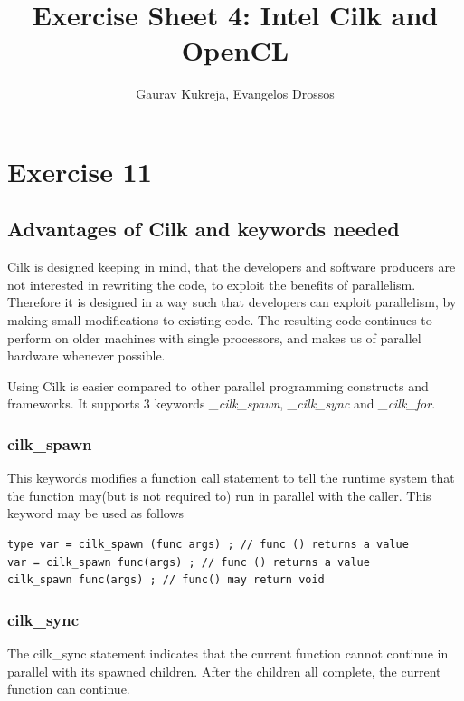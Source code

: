 \documentclass[]{scrartcl}
\title{Exercise Sheet 4: Intel Cilk and OpenCL}
\author{Gaurav Kukreja, Evangelos Drossos}
\begin{document}
\lstset{language=C}

\maketitle

\begin{abstract}

\end{abstract}

\section{Exercise 11}

\subsection{Advantages of Cilk and keywords needed}
Cilk is designed keeping in mind, that the developers and software producers
are not interested in rewriting the code, to exploit the benefits of parallelism.
Therefore it is designed in a way such that developers can exploit parallelism, by 
making small modifications to existing code. The resulting code continues to
perform on older machines with single processors, and makes us of parallel hardware
whenever possible.

Using Cilk is easier compared to other parallel programming constructs and frameworks.
It supports 3 keywords \textit{\_cilk\_spawn}, \textit{\_cilk\_sync} and \textit{\_cilk\_for}.

\subsubsection{cilk\_spawn}
This keywords modifies a function call statement to tell the runtime system that
the function may(but is not required to) run in parallel with the caller. This keyword
may be used as follows

\begin{lstlisting}
type var = cilk_spawn (func args) ; // func () returns a value
var = cilk_spawn func(args) ; // func () returns a value
cilk_spawn func(args) ; // func() may return void
\end{lstlisting}

\subsubsection{cilk\_sync}
The cilk\_sync statement indicates that the current function cannot continue in parallel with its
spawned children. After the children all complete, the current function can continue.
\end{document}
